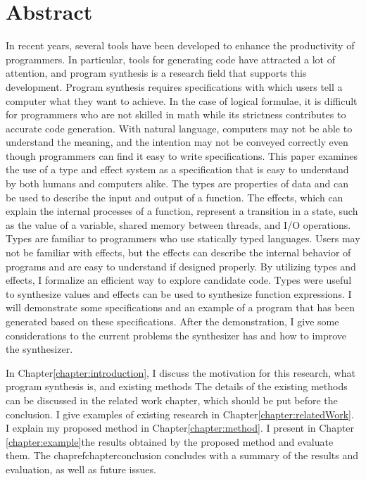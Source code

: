 \documentclass[12pt, a4paper, titlepage]{report}
\begin{document}
\chapter*{Abstract} \label{chapter:abstract}
In recent years, several tools have been developed to enhance the productivity of programmers.
In particular, tools for generating code have attracted a lot of attention, and program synthesis is a research field that supports this development.
Program synthesis requires specifications with which users tell a computer what they want to achieve.
In the case of logical formulae, it is
difficult for programmers who are not skilled in math while its strictness contributes to accurate code generation.
With natural language, computers may not be able to understand the meaning, and the intention may not be conveyed correctly even though programmers can find it easy to write specifications.
This paper examines the use of a type and effect system as a specification that is easy to understand by both humans and computers alike. The types are properties of data and can be used to describe the input and output of a function. The effects, which can explain the internal processes of a function, represent a transition in a state, such as the value of a variable, shared memory between threads, and I/O operations.
Types are familiar to programmers who use statically typed languages.
Users may not be familiar with effects, but the effects can describe the internal behavior of programs and are easy to understand if designed properly.
By utilizing types and effects, I formalize an efficient way to explore candidate code.
Types were useful to synthesize values and effects can be used to synthesize function expressions.
I will demonstrate some specifications and an example of a program that has been generated based on these specifications.
After the demonstration, I give some considerations to the current problems the synthesizer has and how to improve the synthesizer.

In Chapter\ref{chapter:introduction}, I discuss the motivation for this research, what program synthesis is, and existing methods  The details of the existing methods can be discussed in the related work chapter, which should be  put before the conclusion.
I give examples of existing research in Chapter\ref{chapter:relatedWork}.
I explain my proposed method in Chapter\ref{chapter:method}.
I present in Chapter \ref{chapter:example}the results obtained by the proposed method and evaluate them.
The chapref{chapterconclusion} concludes with a summary of the results and evaluation, as well as future issues.
\end{document}
